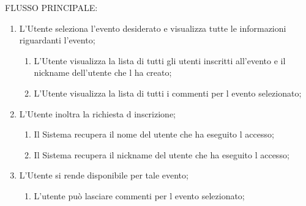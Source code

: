 FLUSSO PRINCIPALE:
\begin{enumerate}
\item L'Utente seleziona l'evento desiderato e visualizza tutte le informazioni riguardanti l'evento;
\begin{enumerate}
\item L'Utente visualizza la lista di tutti gli utenti inscritti all'evento e il nickname dell'utente che l ha creato;
\item L'Utente visualizza la lista di tutti i commenti per l evento selezionato;
\end{enumerate}
\item L'Utente inoltra la richiesta d inscrizione;
\begin{enumerate}
\item Il Sistema recupera il nome del utente che ha eseguito l accesso;
\item Il Sistema recupera il nickname del utente che ha eseguito l accesso;
\end{enumerate}
\item L'Utente si rende disponibile per tale evento;
\begin{enumerate}
\item L'utente può lasciare commenti per l evento selezionato;
\end{enumerate}
\end{enumerate}


